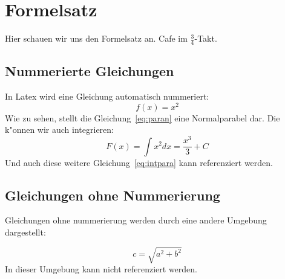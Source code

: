 \section{Formelsatz}

Hier schauen wir uns den Formelsatz an.
Cafe im $\frac{3}{4}$-Takt.

\subsection{Nummerierte Gleichungen}

In Latex wird eine Gleichung automatisch nummeriert:
\begin{equation}\label{eq:paran}
 f(x) = x^2
\end{equation}
Wie zu sehen, stellt die Gleichung~\ref{eq:paran} eine Normalparabel dar.
Die k"onnen wir auch integrieren:
\begin{equation}\label{eq:intpara}
 F(x) = \int x^2 dx = \frac{x^3}{3} + C
\end{equation}
Und auch diese weitere Gleichung~\ref{eq:intpara} kann referenziert werden.

\subsection{Gleichungen ohne Nummerierung}

Gleichungen ohne nummerierung werden durch eine andere Umgebung dargestellt:

\begin{displaymath}
 c = \sqrt{a^2 + b^2}
\end{displaymath}
In dieser Umgebung kann nicht referenziert werden.

